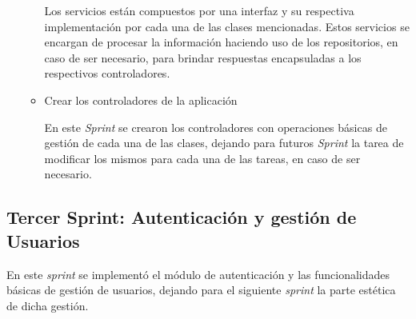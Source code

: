 \begin{enumerate}
\begin{itemize}
            Los servicios están compuestos por una interfaz y su respectiva implementación por cada una de las clases mencionadas. Estos servicios se encargan de procesar la información haciendo uso de los repositorios, en caso de ser necesario, para brindar respuestas encapsuladas a los respectivos controladores.
            
            \item Crear los controladores de la aplicación
            
            En este \textit{Sprint} se crearon los controladores con operaciones básicas de gestión de cada una de las clases, dejando para futuros \textit{Sprint} la tarea de modificar los mismos para cada una de las tareas, en caso de ser necesario.
            
        \end{itemize}
    \end{enumerate}
        
        
    \subsection{Tercer Sprint: Autenticación y gestión de Usuarios}
    
    En este \textit{sprint} se implementó el módulo de autenticación y las funcionalidades básicas de gestión de usuarios, dejando para el siguiente \textit{sprint} la parte estética de dicha gestión.
    
